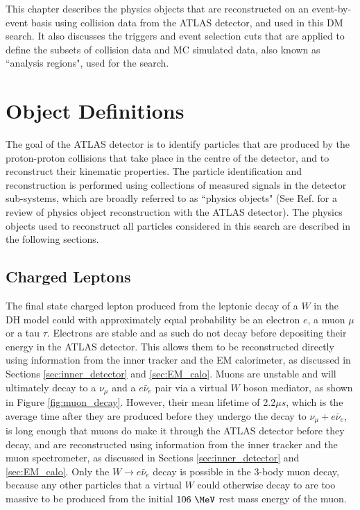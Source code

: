 \label{chapter:objects}

This chapter describes the physics objects that are reconstructed on an event-by-event basis using collision data from the ATLAS detector, and used in this DM search. It also discusses the triggers and event selection cuts that are applied to define the subsets of collision data and MC simulated data, also known as ``analysis regions", used for the search. 

\section{Object Definitions}
\label{sec:object_defs}

The goal of the ATLAS detector is to identify particles that are produced by the proton-proton collisions that take place in the centre of the detector, and to reconstruct their kinematic properties. The particle identification and reconstruction is performed using collections of measured signals in the detector sub-systems, which are broadly referred to as ``physics objects" (See Ref. \cite{physics_objects_atlas_2013} for a review of physics object reconstruction with the ATLAS detector). The physics objects used to reconstruct all particles considered in this search are described in the following sections.

\subsection{Charged Leptons}
\label{sec:charged_leptons}

The final state charged lepton produced from the leptonic decay of a \(W\) in the DH model could with approximately equal probability \cite{pdg_2020} be an electron \(e\), a muon \(\mu\) or a tau \(\tau\). Electrons are stable and as such do not decay before depositing their energy in the ATLAS detector. This allows them to be reconstructed directly using information from the inner tracker and the EM calorimeter, as discussed in Sections \ref{sec:inner_detector} and \ref{sec:EM_calo}. Muons are unstable and will ultimately decay to a \(\nu_\mu\) and a \(e\bar{\nu}_e\) pair via a virtual \(W\) boson mediator, as shown in Figure \ref{fig:muon_decay}. However, their mean lifetime of 2.2\(\mu s\), which is the average time after they are produced before they undergo the decay to \(\nu_\mu+e\bar{\nu}_e\), is long enough that muons do make it through the ATLAS detector before they decay, and are reconstructed using information from the inner tracker and the muon spectrometer, as discussed in Sections \ref{sec:inner_detector} and \ref{sec:EM_calo}. Only the \(W\rightarrow e\bar{\nu}_e\) decay is possible in the 3-body muon decay, because any other particles that a virtual \(W\) could otherwise decay to are too massive to be produced from the initial \(106~\MeV\) rest mass energy of the muon. 

